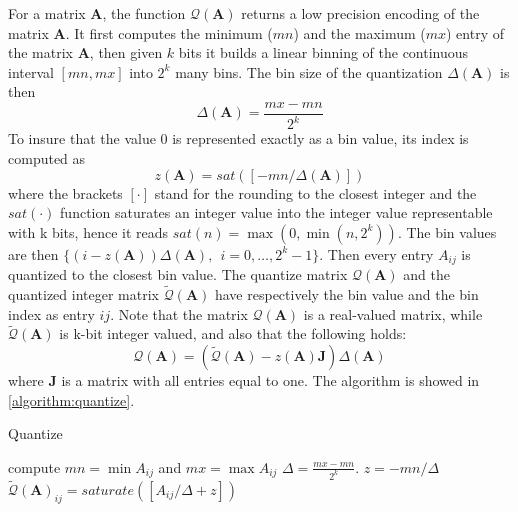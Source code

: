  For a matrix $\mathbf{A}$, the function $\mathcal{Q}(\mathbf{A})$ returns a low precision encoding of the matrix $\mathbf{A}$. It first computes the minimum ($mn$) and the maximum ($mx$) entry of the matrix $\mathbf{A}$, then given $k$ bits it builds a linear binning of the continuous interval $[mn,mx]$ into $2^k$ many bins. The bin size of the quantization $\Delta(\mathbf{A})$ is then \[\Delta(\mathbf{A}) = \frac{mx - mn}{2^k}\] To insure that the value $0$ is represented exactly as a bin value, its index is computed as \[z(\mathbf{A}) = sat([-mn/\Delta(\mathbf{A})])\] where the brackets $[\cdot]$ stand for the rounding to the closest integer and the $sat(\cdot)$ function saturates an integer value into the integer value representable with k bits, hence it reads $sat(n) = \max(0, \min(n,2^k) )$. The bin values are then $\{ (i-z(\mathbf{A})) \Delta(\mathbf{A}), \ \ i = 0, \dots, 2^k -1 \}$. Then every entry $A_{ij}$ is quantized to the closest bin value. The quantize matrix  $\mathcal{Q}(\mathbf{A})$ and the quantized integer matrix $\tilde{\mathcal{Q}}(\mathbf{A})$ have respectively the bin value and the bin index as entry $ij$. Note that the matrix $\mathcal{Q}(\mathbf{A})$ is a real-valued matrix, while $\tilde{\mathcal{Q}}(\mathbf{A})$ is k-bit integer valued, and also that the following holds:
\begin{equation}\label{equation:affine_transf}
\mathcal{Q}(\mathbf{A}) = (\tilde{\mathcal{Q}}(\mathbf{A}) -z(\mathbf{A}) \mathbf{J}  ) \Delta(\mathbf{A})
\end{equation} 
where $\mathbf{J}$ is a matrix with all entries equal to one. The algorithm is showed in \cref{algorithm:quantize}.

\begin{algorithm}
	\caption{Quantize}\label{algorithm:quantize}
	\begin{algorithmic}[1]
		\State compute $mn = \min A_{ij}$ and $mx = \max A_{ij}$
		\State $\Delta = \frac{mx - mn}{2^k}$.
		\State $z = -mn/\Delta$
			\State $\tilde{\mathcal{Q}}(\mathbf{A})_{ij} = saturate([A_{ij}/\Delta + z ])$ 
		\EndFor
	\end{algorithmic}
\end{algorithm}


